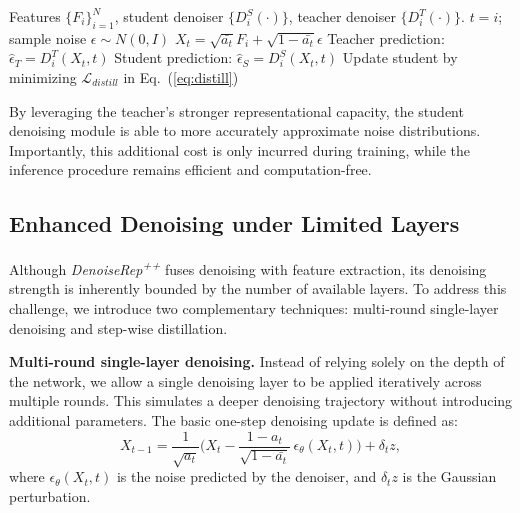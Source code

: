 \documentclass[conference]{IEEEtran}
\begin{document}
{\begin{algorithm}[t]
    \renewcommand{\algorithmicrequire}{\textbf{Input:}}
    \renewcommand{\algorithmicensure}{\textbf{Output:}}
    \caption{Teacher--Student Distillation Training}
    \label{alg:distill}
    \begin{algorithmic}[1]
        \Require Features $\{F_i\}_{i=1}^N$, student denoiser $\{D^S_i(\cdot)\}$, teacher denoiser $\{D^T_i(\cdot)\}$.
        \Repeat
                \State $t = i$; sample noise $\epsilon \sim N(0, I)$
                \State $X_t = \sqrt{\bar{a_t}}F_i + \sqrt{1-\bar{a_t}} \epsilon$
                \State Teacher prediction: $\hat{\epsilon}_T = D^T_i(X_t, t)$
                \State Student prediction: $\hat{\epsilon}_S = D^S_i(X_t, t)$
                \State Update student by minimizing $\mathcal{L}_{distill}$ in Eq.~(\ref{eq:distill})
            \EndFor
    \end{algorithmic}
\end{algorithm}

By leveraging the teacher’s stronger representational capacity, the student denoising module is able to more accurately approximate noise distributions. Importantly, this additional cost is only incurred during training, while the inference procedure remains efficient and computation-free.  




\subsection{Enhanced Denoising under Limited Layers}
\label{sec:method_multi}

Although \textit{DenoiseRep\textsuperscript{++}} fuses denoising with feature extraction, its denoising strength is inherently bounded by the number of available layers. To address this challenge, we introduce two complementary techniques: multi-round single-layer denoising and step-wise distillation.  

\textbf{Multi-round single-layer denoising.}  
Instead of relying solely on the depth of the network, we allow a single denoising layer to be applied iteratively across multiple rounds. This simulates a deeper denoising trajectory without introducing additional parameters. The basic one-step denoising update is defined as:  
\begin{equation}
X_{t-1} = \frac{1}{\sqrt{a_t}} \Big( X_t - \frac{1-a_t}{\sqrt{1-\bar{a_t}}}\,\epsilon_\theta(X_t,t) \Big) + \delta_t z,
\label{eq:multi_basic}
\end{equation}
where $\epsilon_\theta(X_t,t)$ is the noise predicted by the denoiser, and $\delta_t z$ is the Gaussian perturbation.  

}
\end{document}
